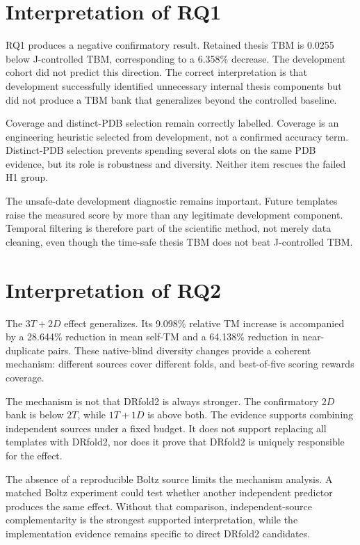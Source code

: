 \documentclass[12pt,a4paper,oneside]{report}
\begin{document}
\section{Interpretation of RQ1}

RQ1 produces a negative confirmatory result. Retained thesis TBM is 0.0255 below
J-controlled TBM, corresponding to a 6.358\% decrease. The development cohort did not
predict this direction. The correct interpretation is that development successfully
identified unnecessary internal thesis components but did not produce a TBM bank that
generalizes beyond the controlled baseline.

Coverage and distinct-PDB selection remain correctly labelled. Coverage is an
engineering heuristic selected from development, not a confirmed accuracy term.
Distinct-PDB selection prevents spending several slots on the same PDB evidence, but
its role is robustness and diversity. Neither item rescues the failed H1 group.

The unsafe-date development diagnostic remains important. Future templates raise the
measured score by more than any legitimate development component. Temporal filtering
is therefore part of the scientific method, not merely data cleaning, even though the
time-safe thesis TBM does not beat J-controlled TBM.

\section{Interpretation of RQ2}

The $3T+2D$ effect generalizes. Its 9.098\% relative TM increase is accompanied by a
28.644\% reduction in mean self-TM and a 64.138\% reduction in near-duplicate pairs.
These native-blind diversity changes provide a coherent mechanism: different sources
cover different folds, and best-of-five scoring rewards coverage.

The mechanism is not that DRfold2 is always stronger. The confirmatory $2D$ bank is
below $2T$, while $1T+1D$ is above both. The evidence supports combining independent
sources under a fixed budget. It does not support replacing all templates with
DRfold2, nor does it prove that DRfold2 is uniquely responsible for the effect.

The absence of a reproducible Boltz source limits the mechanism analysis. A matched
Boltz experiment could test whether another independent predictor produces the same
effect. Without that comparison, independent-source complementarity is the strongest
supported interpretation, while the implementation evidence remains specific to
direct DRfold2 candidates.
\end{document}
